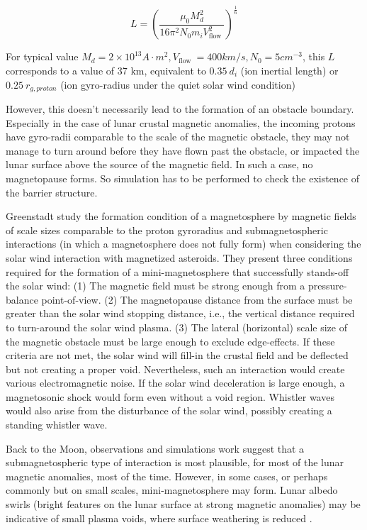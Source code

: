 $$L=\left(\frac{\mu_{0} M_d^{2}}{16 \pi^{2} N_{0} m_{i} V_{\text {flow }}^{2}}\right)^{\frac{1}{6}}$$

For typical value $M_d = 2 \times 10^{13} A \cdot m^2, V_{\text {flow }} = 400 km / s , N_0 = 5 cm^{-3}$, this $L$ corresponds to a value of 37 km, equivalent to $0.35 ~ d_i$ (ion inertial length) or $0.25 ~ r_{g,proton}$ (ion gyro-radius under the quiet solar wind condition)


However, this doesn't necessarily lead to the formation of an obstacle boundary. Especially in the case of lunar crustal magnetic anomalies, the incoming protons have gyro-radii comparable to the scale of the magnetic obstacle, they may not manage to turn around before they have flown past the obstacle, or impacted the lunar surface above the source of the magnetic field. In such a case, no magnetopause forms. So simulation has to be performed to check the existence of the barrier structure.

Greenstadt study the formation condition of a magnetosphere by magnetic fields of scale sizes comparable to the proton gyroradius and submagnetospheric interactions (in which a magnetosphere does not fully form) when considering the solar wind interaction with magnetized asteroids. They present three conditions required for the formation of a mini-magnetosphere that successfully stands-off the solar wind: (1) The magnetic field must be strong enough from a pressure-balance point-of-view. (2) The magnetopause distance from the surface must be greater than the solar wind stopping distance, i.e., the vertical distance required to turn-around the solar wind plasma. (3) The lateral (horizontal) scale size of the magnetic obstacle must be large enough to exclude edge-effects. If these criteria are not met, the solar wind will fill-in the crustal field and be deflected but not creating a proper void. Nevertheless, such an interaction would create various electromagnetic noise. If the solar wind deceleration is large enough, a magnetosonic shock would form even without a void region. Whistler waves would also arise from the disturbance of the solar wind, possibly creating a standing whistler wave.

Back to the Moon, observations and simulations work suggest that a submagnetospheric type of interaction is most plausible, for most of the lunar magnetic anomalies, most of the time. However, in some cases, or perhaps commonly but on small scales, mini-magnetosphere may form. Lunar albedo swirls (bright features on the lunar surface at strong magnetic anomalies) may be indicative of small plasma voids, where surface weathering is reduced \citep{garrick-bethellSpectralPropertiesMagnetic2011}.
